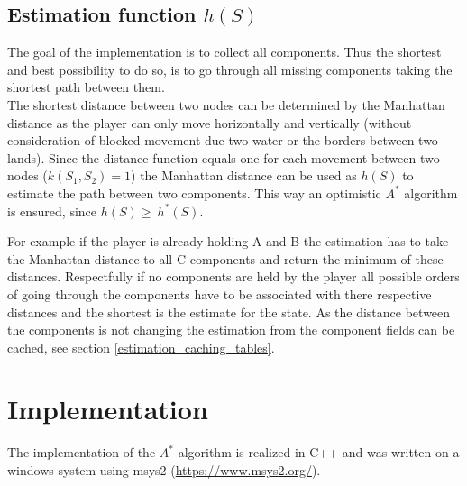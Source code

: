 \documentclass{article}
\begin{document}
\subsection{Estimation function $h(S)$}
The goal of the implementation is to collect all components. Thus the shortest and best possibility to do so, is to go through all missing components taking the shortest path between them. \\
The shortest distance between two nodes can be determined by the Manhattan distance as the player can only move horizontally and vertically (without consideration of blocked movement due two water or the borders between two lands). Since the distance function equals one for each movement between two nodes ($k(S_1, S_2) = 1$) the Manhattan distance can be used as $h(S)$ to estimate the path between two components.
This way an optimistic $A^*$ algorithm is ensured, since $h(S) \geq \ h^*(S)$.

 For example if the player is already holding A and B the estimation has to take the Manhattan distance to all C components and return the minimum of these distances. Respectfully if no components are held by the player all possible orders of going through the components have to be associated with there respective distances and the shortest is the estimate for the state. As the distance between the components is not changing the estimation from the component fields can be cached, see section \ref{estimation_caching_tables}. %


\section{Implementation}
The implementation of the $A^*$ algorithm is realized in C++ and was written on a windows system using msys2 (\url{https://www.msys2.org/}).
\end{document}
